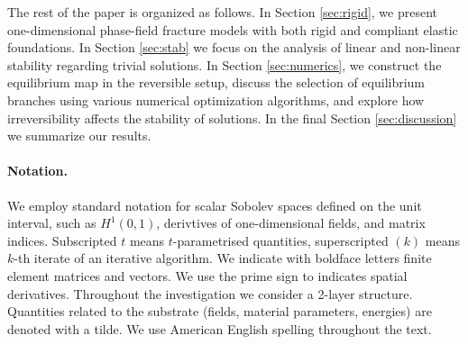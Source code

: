 

The rest of the paper is organized as follows. In Section \ref{sec:rigid}, we present one-dimensional phase-field fracture models with both rigid and compliant elastic foundations. In Section \ref{sec:stab} we focus on the analysis  of linear and non-linear stability regarding trivial solutions. In Section \ref{sec:numerics}, we construct the equilibrium map in the reversible setup, discuss the selection of equilibrium branches using various numerical optimization algorithms, and explore how irreversibility affects the stability of solutions. In the final Section \ref{sec:discussion}  we summarize our results.


\paragraph{Notation.} We employ standard notation for scalar Sobolev spaces defined on the unit interval, such as $H^1(0, 1)$, derivtives of one-dimensional fields, and matrix indices. Subscripted $t$ means $t$-parametrised quantities, superscripted $(k)$ means $k$-th iterate of an iterative algorithm. 
We indicate with boldface letters finite element matrices and vectors. 
We use the prime sign to indicates spatial derivatives. Throughout the investigation we consider a 2-layer structure. Quantities related to the substrate (fields, material parameters, energies) are denoted with a tilde.
We use American English spelling throughout the text.

